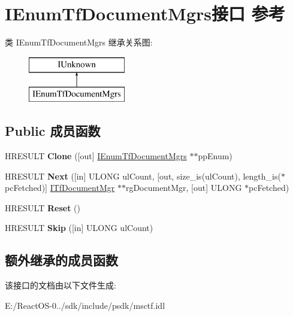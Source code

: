 \hypertarget{interface_i_enum_tf_document_mgrs}{}\section{I\+Enum\+Tf\+Document\+Mgrs接口 参考}
\label{interface_i_enum_tf_document_mgrs}
类 I\+Enum\+Tf\+Document\+Mgrs 继承关系图\+:\begin{figure}[H]
\begin{center}
\leavevmode
\includegraphics[height=2.000000cm]{interface_i_enum_tf_document_mgrs}
\end{center}
\end{figure}
\subsection*{Public 成员函数}
\begin{DoxyCompactItemize}
\item 
\mbox{\label{interface_i_enum_tf_document_mgrs_a6fcbedcb6e49c85370b390ca2c2c078a}} 
H\+R\+E\+S\+U\+LT {\bfseries Clone} (\mbox{[}out\mbox{]} \hyperlink{interface_i_enum_tf_document_mgrs}{I\+Enum\+Tf\+Document\+Mgrs} $\ast$$\ast$pp\+Enum)
\item 
\mbox{\label{interface_i_enum_tf_document_mgrs_a9f5ccf688ea02fcee1fb0a693631d1bf}} 
H\+R\+E\+S\+U\+LT {\bfseries Next} (\mbox{[}in\mbox{]} U\+L\+O\+NG ul\+Count, \mbox{[}out, size\+\_\+is(ul\+Count), length\+\_\+is($\ast$pc\+Fetched)\mbox{]} \hyperlink{interface_i_tf_document_mgr}{I\+Tf\+Document\+Mgr} $\ast$$\ast$rg\+Document\+Mgr, \mbox{[}out\mbox{]} U\+L\+O\+NG $\ast$pc\+Fetched)
\item 
\mbox{\label{interface_i_enum_tf_document_mgrs_a46888decda8586a12c60dec07cac0489}} 
H\+R\+E\+S\+U\+LT {\bfseries Reset} ()
\item 
\mbox{\label{interface_i_enum_tf_document_mgrs_a21ae55a21977f74b02ca3d2dccadea80}} 
H\+R\+E\+S\+U\+LT {\bfseries Skip} (\mbox{[}in\mbox{]} U\+L\+O\+NG ul\+Count)
\end{DoxyCompactItemize}
\subsection*{额外继承的成员函数}


该接口的文档由以下文件生成\+:\begin{DoxyCompactItemize}
\item 
E\+:/\+React\+O\+S-\/0../sdk/include/psdk/msctf.\+idl\end{DoxyCompactItemize}
